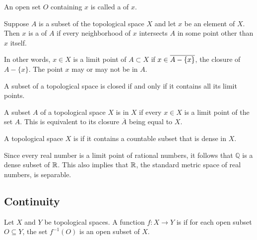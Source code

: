 \begin{definition}
An open set $O$ containing $x$ is called a  of $x$.
\end{definition}

\begin{definition}
Suppose $A$ is a subset of the topological space $X$ and let $x$ be an element of $X$.
Then $x$ is a  of $A$ if every neighborhood of $x$ intersects $A$ in some point other than $x$ itself.
\end{definition}

In other words, $x \in X$ is a limit point of $A \subset X$ if $x \in \overline{A - \{ x \}}$, the closure of $A - \{ x \}$.
The point $x$ may or may not be in $A$.

\begin{theorem}
A subset of a topological space is closed if and only if it contains all its limit points.
\end{theorem}

\begin{definition}
A subset $A$ of a topological space $X$ is  in $X$ if every $x\in X$ is a limit point of the set $A$.
This is equivalent to its closure $\overline{A}$ being equal to $X$.
\end{definition}

\begin{definition}
A topological space $X$ is  if it contains a countable subset that is dense in $X$.
\end{definition}

\begin{example}
Since every real number is a limit point of rational numbers, it follows that $\mathbb{Q}$ is a dense subset of $\mathbb{R}$.
This also implies that $\mathbb{R}$, the standard metric space of real numbers, is separable.
\end{example}


\subsection{Continuity}

\begin{definition}
Let $X$ and $Y$ be topological spaces.
A function $f \colon X \rightarrow Y$ is  if for each open subset $O \subseteq Y$, the set $f^{-1} (O)$ is an open subset of $X$.
\end{definition}

